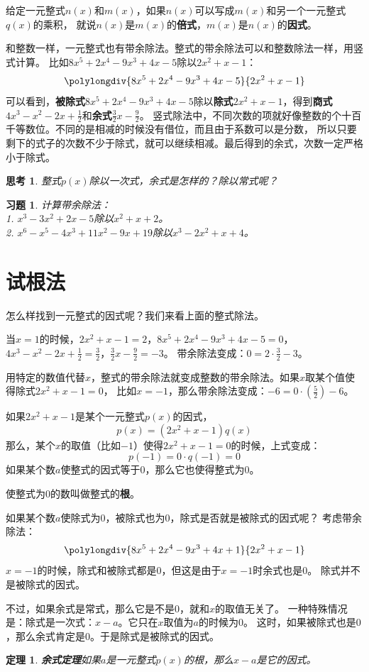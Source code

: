 \documentclass[12pt,UTF8]{ctexbook}
\newtheorem{tm}{定理}[section]
\newtheorem{sk}{思考}[section]
\newtheorem{xt}{习题}[section]
\begin{document}
给定一元整式$n(x)$和$m(x)$，如果$n(x)$可以写成$m(x)$和另一个一元整式$q(x)$的乘积，
就说$n(x)$是$m(x)$的\textbf{倍式}，$m(x)$是$n(x)$的\textbf{因式}。

和整数一样，一元整式也有带余除法。整式的带余除法可以和整数除法一样，用竖式计算。
比如$8x^5 +2x^4 -9x^3+ 4x-5$除以$2x^2+x-1$：
$$\polylongdiv{8x^5 +2x^4 -9x^3+ 4x-5}{2x^2+x-1}$$
可以看到，\textbf{被除式}$8x^5 +2x^4 -9x^3+ 4x-5$除以\textbf{除式}$2x^2+x-1$，得到\textbf{商式}$4x^3-x^2-2x+\frac12$和\textbf{余式}$\frac32 x- \frac92$。
竖式除法中，不同次数的项就好像整数的个十百千等数位。不同的是相减的时候没有借位，而且由于系数可以是分数，
所以只要剩下的式子的次数不少于除式，就可以继续相减。最后得到的余式，次数一定严格小于除式。
\begin{sk}\label{sk:2-0-0}
    整式$p(x)$除以一次式，余式是怎样的？除以常式呢？
\end{sk}
\begin{xt}\label{xt:2-0-0}
    计算带余除法：\\
    1. $x^3 - 3x^2 + 2x - 5$除以$x^2 + x + 2$。\\
    2. $x^6 - x^5 - 4x^3 + 11x^2 - 9x + 19$除以$x^3 - 2x^2 + x + 4$。
\end{xt}

\section{试根法}
怎么样找到一元整式的因式呢？我们来看上面的整式除法。

当$x=1$的时候，$2x^2+x-1 = 2$，$8x^5 +2x^4 -9x^3+ 4x-5 = 0$，
$4x^3-x^2-2x+\frac12 = \frac32$，$\frac32 x- \frac92 = -3$。
带余除法变成：$0 = 2 \cdot \frac32 - 3$。

用特定的数值代替$x$，整式的带余除法就变成整数的带余除法。如果$x$取某个值使得除式$2x^2 + x - 1 = 0$，
比如$x = -1$，那么带余除法变成：$-6 = 0\cdot \left(\frac52\right) - 6$。

如果$2x^2 + x - 1$是某个一元整式$p(x)$的因式，
$$ p(x) = (2x^2 + x - 1)q(x)$$
那么，某个$x$的取值（比如$-1$）使得$2x^2 + x - 1 = 0$的时候，上式变成：
$$ p(-1) = 0 \cdot q(-1) = 0$$
如果某个数$a$使整式的因式等于$0$，那么它也使得整式为$0$。

使整式为$0$的数叫做整式的\textbf{根}。

如果某个数$a$使除式为$0$，被除式也为$0$，除式是否就是被除式的因式呢？
考虑带余除法：
$$\polylongdiv{8x^5 +2x^4 -9x^3+ 4x+1}{2x^2+x-1}$$
$x = -1$的时候，除式和被除式都是$0$，但这是由于$x = -1$时余式也是$0$。
除式并不是被除式的因式。

不过，如果余式是常式，那么它是不是$0$，就和$x$的取值无关了。
一种特殊情况是：除式是一次式：$x - a$。它只在$x$取值为$a$的时候为$0$。
这时，如果被除式也是$0$，那么余式肯定是$0$。于是除式是被除式的因式。
\begin{tm}\textbf{余式定理}\label{tm:2-1-0}
    如果$a$是一元整式$p(x)$的根，那么$x-a$是它的因式。
\end{tm}
\end{document}
